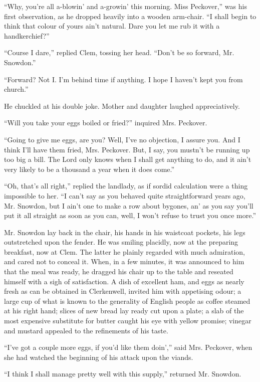 ``Why, you're all a-blowin' and a-growin' this morning. Miss Peckover,''
was his first observation, as he dropped heavily into a {}wooden
arm-chair. ``I shall begin to think that colour of yours ain't natural.
Dare you let me rub it with a handkerchief?''

``Course I dare,'' replied Clem, tossing her head. ``Don't be so
forward, Mr. Snowdon.''

``Forward? Not I. I'm behind time if anything. I hope I haven't kept you
from church.''

He chuckled at his double joke. Mother and daughter laughed
appreciatively.

``Will you take your eggs boiled or fried?'' inquired Mrs. Peckover.

``Going to give me eggs, are you? Well, I've no objection, I assure you.
And I think I'll have them fried, Mrs. Peckover. But, I say, you mustn't
be running up too big a bill. The Lord only knows when I shall get
anything to do, and it ain't very likely to be a thousand a year when it
does come.''

``Oh, that's all right,'' replied the landlady, as if sordid calculation
were a thing impossible to her. ``I can't say as you behaved quite
straightforward years ago, Mr. Snowdon, but I ain't one to make a row
about bygones, {}an' as you say you'll put it all straight as soon as
you can, well, I won't refuse to trust you once more.''

Mr. Snowdon lay back in the chair, his hands in his waistcoat pockets,
his legs outstretched upon the fender. He was smiling placidly, now at
the preparing breakfast, now at Clem. The latter he plainly regarded
with much admiration, and cared not to conceal it. When, in a few
minutes, it was announced to him that the meal was ready, he dragged his
chair up to the table and reseated himself with a sigh of satisfaction.
A dish of excellent ham, and eggs as nearly fresh as can be obtained in
Clerkenwell, invited him with appetising odour; a large cup of what is
known to the generality of English people as coffee steamed at his right
hand; slices of new bread lay ready cut upon a plate; a slab of the most
expensive substitute for butter caught his eye with yellow promise;
vinegar and mustard appealed to the refinements of his taste.

``I've got a couple more eggs, if you'd like {}them doin','' said Mrs.
Peckover, when she had watched the beginning of his attack upon the
viands.

``I think I shall manage pretty well with this supply,'' returned Mr.
Snowdon.


